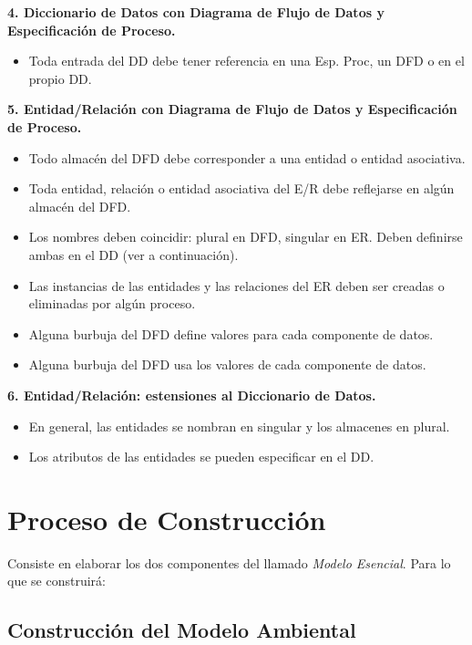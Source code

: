\textbf{4. Diccionario de Datos con Diagrama de Flujo de Datos y Especificación de Proceso.}

\begin{itemize}[noitemsep]
\item Toda entrada del DD debe tener referencia en una Esp. Proc, un DFD o en el propio DD.
\end{itemize}

\textbf{5. Entidad/Relación con Diagrama de Flujo de Datos y Especificación de Proceso.}

\begin{itemize}[noitemsep]
\item Todo almacén del DFD debe corresponder a una entidad o entidad asociativa.
\item Toda entidad, relación o entidad asociativa del E/R debe reflejarse en algún almacén del DFD.
\item Los nombres deben coincidir: plural en DFD, singular en ER. Deben definirse ambas en el DD (ver a continuación).
\item Las instancias de las entidades y las relaciones del ER deben ser creadas o eliminadas por algún proceso.
\item Alguna burbuja del DFD define valores para cada componente de datos.
\item Alguna burbuja del DFD usa los valores de cada componente de datos.
\end{itemize}

\textbf{6. Entidad/Relación: estensiones al Diccionario de Datos.}

\begin{itemize}[noitemsep]
\item En general, las entidades se nombran en singular y los almacenes en plural.
\item Los atributos de las entidades se pueden especificar en el DD.
\end{itemize}

\section{Proceso de Construcción}

Consiste en elaborar los dos componentes del llamado \textit{Modelo Esencial}. Para lo que se construirá:

\subsection{Construcción del Modelo Ambiental}


